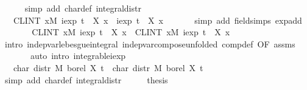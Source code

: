\documentclass[leqno]{article}
\theoremstyle{definition}
\begin{document}
\begin{isabellebody}
\ \ \ \ \isamarkupfalse%
\ {\isacharparenleft}simp\ add{\isacharcolon}\ char{\isacharunderscore}def\ integral{\isacharunderscore}distr{\isacharparenright}\isanewline
\ \ \isamarkupfalse%
\ \isamarkupfalse%
\ {\isachardoublequoteopen}{\isasymdots}\ {\isacharequal}\ {\isacharparenleft}CLINT\ x{\isacharbar}M{\isachardot}\ iexp\ {\isacharparenleft}t\ {\isacharasterisk}\ {\isacharparenleft}X{}\ x{\isacharparenright}{\isacharparenright}\ {\isacharasterisk}\ iexp\ {\isacharparenleft}t\ {\isacharasterisk}\ {\isacharparenleft}X{}\ x{\isacharparenright}{\isacharparenright}{\isacharparenright}\ {\isachardoublequoteclose}\isanewline
\ \ \ \ \isamarkupfalse%
\ {\isacharparenleft}simp\ add{\isacharcolon}\ field{\isacharunderscore}simps\ exp{\isacharunderscore}add{\isacharparenright}\isanewline
\ \ \isamarkupfalse%
\ \isamarkupfalse%
\ {\isachardoublequoteopen}{\isasymdots}\ {\isacharequal}\ {\isacharparenleft}CLINT\ x{\isacharbar}M{\isachardot}\ iexp\ {\isacharparenleft}t\ {\isacharasterisk}\ {\isacharparenleft}X{}\ x{\isacharparenright}{\isacharparenright}{\isacharparenright}\ {\isacharasterisk}\ {\isacharparenleft}CLINT\ x{\isacharbar}M{\isachardot}\ iexp\ {\isacharparenleft}t\ {\isacharasterisk}\ {\isacharparenleft}X{}\ x{\isacharparenright}{\isacharparenright}{\isacharparenright}{\isachardoublequoteclose}\isanewline
\ \ \ \ \isamarkupfalse%
\ {\isacharparenleft}intro\ indep{\isacharunderscore}var{\isacharunderscore}lebesgue{\isacharunderscore}integral\ indep{\isacharunderscore}var{\isacharunderscore}compose{\isacharbrackleft}unfolded\ comp{\isacharunderscore}def{\isacharcomma}\ OF\ assms{\isacharbrackright}{\isacharparenright}\isanewline
\ \ \ \ \ \ \ {\isacharparenleft}auto\ intro{\isacharbang}{\isacharcolon}\ integrable{\isacharunderscore}iexp{\isacharparenright}\isanewline
\ \ \isamarkupfalse%
\ \isamarkupfalse%
\ {\isachardoublequoteopen}{\isasymdots}\ {\isacharequal}\ char\ {\isacharparenleft}distr\ M\ borel\ X{}{\isacharparenright}\ t\ {\isacharasterisk}\ char\ {\isacharparenleft}distr\ M\ borel\ X{}{\isacharparenright}\ t{\isachardoublequoteclose}\isanewline
\ \ \ \ \isamarkupfalse%
\ {\isacharparenleft}simp\ add{\isacharcolon}\ char{\isacharunderscore}def\ integral{\isacharunderscore}distr{\isacharparenright}\isanewline
\ \ \isamarkupfalse%
\ \isamarkupfalse%
\ {\isacharquery}thesis\ \isacommand{{\isachardot}}\isamarkupfalse%

\end{isabellebody}
\end{document}
